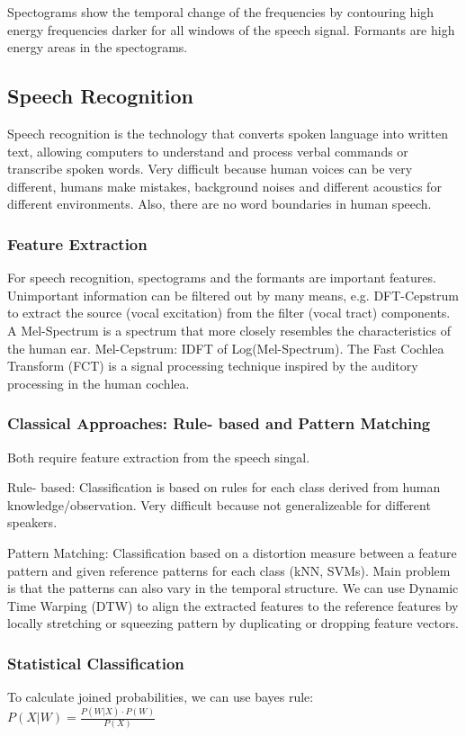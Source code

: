 \documentclass[10pt, a4paper]{article}
\begin{document}
Spectograms show the temporal change of the frequencies by contouring high energy frequencies darker for all windows of the speech signal.
Formants are high energy areas in the spectograms.

\subsection{Speech Recognition}
Speech recognition is the technology that converts spoken language into written text,
allowing computers to understand and process verbal commands or transcribe spoken words.
Very difficult because human voices can be very different, humans make mistakes, background noises and different acoustics for different environments.
Also, there are no word boundaries in human speech.

\subsubsection{Feature Extraction}
For speech recognition, spectograms and the formants are important features.
Unimportant information can be filtered out by many means, e.g. DFT-Cepstrum to extract the source (vocal excitation) from the filter (vocal tract) components.
A Mel-Spectrum is a spectrum that more closely resembles the characteristics of the human ear.
Mel-Cepstrum: IDFT of Log(Mel-Spectrum). The Fast Cochlea Transform (FCT) is a signal processing technique inspired by the auditory processing in the human cochlea.

\subsubsection{Classical Approaches: Rule- based and Pattern Matching}
Both require feature extraction from the speech singal.

Rule- based: Classification is based on rules for each class derived from human knowledge/observation.
Very difficult because not generalizeable for different speakers.

Pattern Matching: Classification based on a distortion measure between a feature pattern and given reference patterns for each class (kNN, SVMs).
Main problem is that the patterns can also vary in the temporal structure.
We can use Dynamic Time Warping (DTW) to align the extracted features to the reference features by
locally stretching or squeezing pattern by duplicating or dropping feature vectors.

\subsubsection{Statistical Classification}
To calculate joined probabilities, we can use bayes rule: $ P(X | W) = \frac{P(W | X) \cdot P(W)}{P(X)} $
\end{document}
